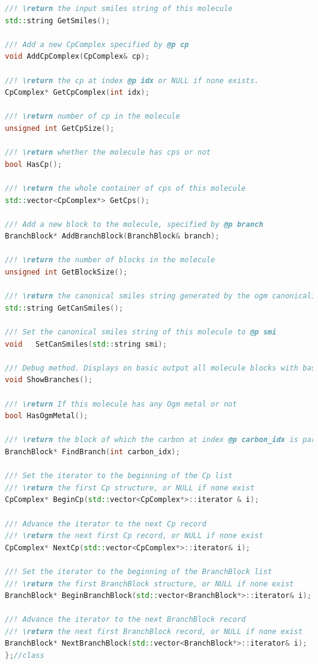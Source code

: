 \begin{itemize}
\begin{lstlisting}[language=C++]
//! \return the input smiles string of this molecule
std::string GetSmiles();

//! Add a new CpComplex specified by @p cp
void AddCpComplex(CpComplex& cp);

//! \return the cp at index @p idx or NULL if none exists.
CpComplex* GetCpComplex(int idx);

//! \return number of cp in the molecule
unsigned int GetCpSize();

//! \return whether the molecule has cps or not
bool HasCp();

//! \return the whole container of cps of this molecule
std::vector<CpComplex*> GetCps();

//! Add a new block to the molecule, specified by @p branch
BranchBlock* AddBranchBlock(BranchBlock& branch);

//! \return the number of blocks in the molecule
unsigned int GetBlockSize();

//! \return the canonical smiles string generated by the ogm canonicalization methods
std::string GetCanSmiles();

//! Set the canonical smiles string of this molecule to @p smi
void   SetCanSmiles(std::string smi);

//! Debug method. Displays on basic output all molecule blocks with basic information of the atoms.
void ShowBranches();

//! \return If this molecule has any Ogm metal or not
bool HasOgmMetal();

//! \return the block of which the carbon at index @p carbon_idx is part, or NULL if no such block exists
BranchBlock* FindBranch(int carbon_idx);

//! Set the iterator to the beginning of the Cp list
//! \return the first Cp structure, or NULL if none exist
CpComplex* BeginCp(std::vector<CpComplex*>::iterator & i);

//! Advance the iterator to the next Cp record
//! \return the next first Cp record, or NULL if none exist
CpComplex* NextCp(std::vector<CpComplex*>::iterator& i);

//! Set the iterator to the beginning of the BranchBlock list
//! \return the first BranchBlock structure, or NULL if none exist
BranchBlock* BeginBranchBlock(std::vector<BranchBlock*>::iterator& i);

//! Advance the iterator to the next BranchBlock record
//! \return the next first BranchBlock record, or NULL if none exist
BranchBlock* NextBranchBlock(std::vector<BranchBlock*>::iterator& i);
};//class
    \end{lstlisting}



\end{itemize}
